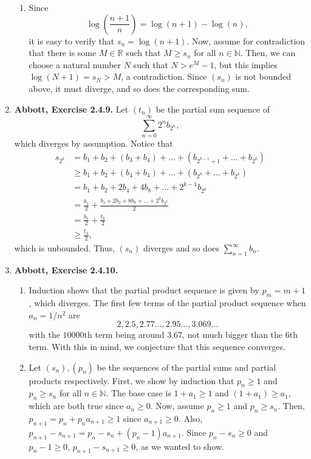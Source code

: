 \documentclass{article}
\newcommand{\N}{\mathbb{N}}
\newcommand{\R}{\mathbb{R}}
\newcommand{\exc}[2][Abbott]{\item \textbf{#1, Exercise #2.}}
\let\oldlog\log
\renewcommand{\log}[1]{\oldlog \left( #1 \right)}
\begin{document}
\begin{enumerate}
\begin{enumerate}
        \item Since 
        \begin{equation*}
            \log{\frac{n+1}{n}}= \log{n+1} - \log{n},
        \end{equation*} it is easy to verify that $s_n = \log{n+1}$. Now, assume for contradiction that there is some $M \in \R$ such that $M \geq s_n$ for all $n \in \N$. Then, we can choose a natural number $N$ such that $N > e^M - 1$, but this implies $\log{N+1} = s_N > M$, a contradiction. Since $(s_n)$ is not bounded above, it must diverge, and so does the corresponding sum.
    \end{enumerate}
    
    \exc{2.4.9}
    Let $(t_n)$ be the partial sum sequence of \begin{equation*}
        \sum_{n=0}^\infty 2^n b_{2^n},
    \end{equation*} which diverges by assumption. Notice that 
    \begin{align*}
        s_{2^k} &= b_1 + b_2 + (b_3 + b_4) + \dots + (b_{2^{k-1}+1} + \dots + b_{2^k}) \\
        &\geq b_1 + b_2 + (b_4 + b_4) + \dots + (b_{2^k} + \dots + b_{2^k}) \\
        &= b_1 + b_2 + 2b_4 + 4b_8 + \dots + 2^{k-1}b_{2^k} \\
        &= \frac{b_1}{2} + \frac{b_1 + 2b_2 + 8b_8 + \dots + 2^k b_{2^k}}{2} \\
        &= \frac{b_1}{2} + \frac{t_k}{2} \\
        &\geq \frac{t_k}{2},
    \end{align*} which is unbounded. Thus, $(s_n)$ diverges and so does $\sum_{n=1}^\infty b_n.$
    
    \exc{2.4.10}
    \begin{enumerate}
        \item Induction shows that the partial product sequence is given by $p_m = m+1$, which diverges. The first few terms of the partial product sequence when $a_n = 1/n^2$ are 
        \begin{equation*}
            2, 2.5, 2.77\dots, 2.95\dots,3.069\dots
        \end{equation*} with the $10000$th term being around $3.67$, not much bigger than the $6$th term. With this in mind, we conjecture that this sequence converges.
        
        \item Let $(s_n),(p_n)$ be the sequences of the partial sums and partial products respectively. First, we show by induction that $p_n \geq 1$ and $p_n \geq s_n$ for all $n \in \N$. The base case is $1+a_1 \geq 1$ and $(1+a_1) \geq a_1$, which are both true since $a_n \geq 0$. Now, assume $p_n \geq 1$ and $p_n \geq s_n$. Then, $p_{n+1} = p_n + p_{n}a_{n+1} \geq 1$ since $a_{n+1} \geq 0$. Also, $p_{n+1}-s_{n+1} = p_n-s_n + (p_{n}-1)a_{n+1}$. Since $p_n - s_n \geq 0$ and $p_n -1 \geq 0$, $p_{n+1}-s_{n+1} \geq 0$, as we wanted to show.
        

\end{enumerate}
\end{enumerate}
\end{document}
